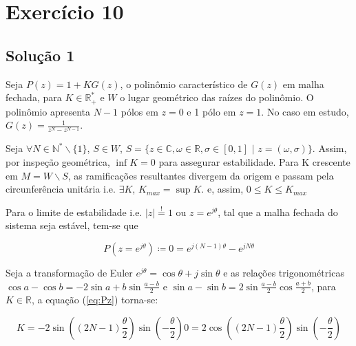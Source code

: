 \section*{Exercício 10}
\label{ex:10}

\subsection*{Solução 1}

    Seja $P(z) = 1 + K G(z)$, o polinômio característico de $G(z)$ em malha fechada, para $K \in \mathbb{R}^*_{+}$ e $W$ o lugar geométrico das raízes do polinômio. O polinômio apresenta $N-1$ pólos em $z = 0$ e 1 pólo em $z = 1$. No caso em estudo, $G(z) = \frac{1}{z^{N} - z^{N-1}}$.
    
    Seja $\forall N \in \mathbb{N}^*\backslash{\{1\}}$, $S \in W$, $S = \{z \in \mathbb{C}, \omega \in \mathbb{R}, \sigma \in [0, 1] \,\, | \,\, z = (\omega, \sigma)\}$. Assim, por inspeção geométrica, $\inf K = 0$ para assegurar estabilidade. Para K crescente em $M = W \backslash {S}$, as ramificações resultantes divergem da origem e passam pela circunferência unitária i.e. $\exists K$, $K_{max} = \sup K$. e, assim, $0 \leq K \leq K_{max}$
    
    Para o limite de estabilidade i.e. $|z| \stackrel{!}{=} 1$ ou $z = e^{j \theta}$, tal que a malha fechada do sistema seja estável, tem-se que
    
        \begin{equation}
            P(z = e^{j \theta}) \coloneqq 0 = e^{j (N-1) \theta} - e^{j N \theta}
            \label{eq:Pz}
        \end{equation}
    
    Seja a transformação de Euler $e^{j \theta} = \cos{\theta} + j \sin{\theta}$ e as relações trigonométricas $\cos{a} - \cos{b} = -2 \sin{a+b} \sin{\frac{a-b}{2}}$ e $\sin{a} - \sin{b} = 2 \sin{\frac{a-b}{2}} \cos{\frac{a+b}{2}}$, para $K \in \mathbb{R}$, a equação (\ref{eq:Pz}) torna-se:
    
        \begin{subequations}
            \begin{equation}
                K = -2 \sin\left((2N - 1) \frac{\theta}{2}\right) \sin\left(- \frac{\theta}{2}\right)
            \end{equation}
            \begin{equation}
                0 =  2 \cos\left((2N - 1) \frac{\theta}{2}\right) \sin\left(-\frac{\theta}{2}\right)
            \label{eq:imagP}
            \end{equation}
        \end{subequations}
    
